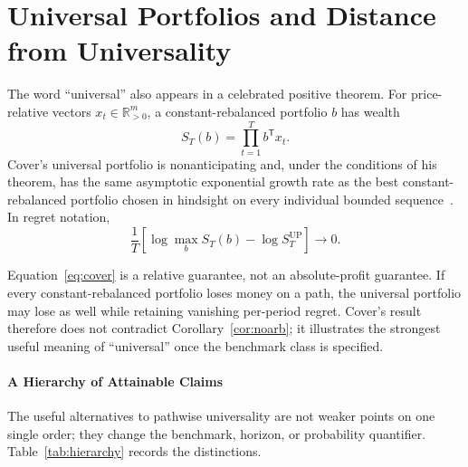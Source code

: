 \documentclass[aps,pra,reprint,superscriptaddress,amsmath,amssymb,floatfix]{revtex4-2}
\theoremstyle{plain}
\theoremstyle{definition}
\theoremstyle{remark}
\begin{document}
\section{Universal Portfolios and Distance from Universality}
\label{sec:cover}

The word ``universal'' also appears in a celebrated positive theorem.
For price-relative vectors \(x_t\in\mathbb{R}_{>0}^m\), a constant-rebalanced
portfolio \(b\) has wealth
\[
  S_T(b)=\prod_{t=1}^T b^\mathsf{T}x_t.
\]
Cover's universal portfolio is nonanticipating and, under the conditions of
his theorem, has the same asymptotic exponential growth rate as the best
constant-rebalanced portfolio chosen in hindsight on every individual bounded
sequence~\cite{Cover1991}. In regret notation,
\begin{equation}
  \frac1T\left[
  \log\max_{b}S_T(b)-\log S_T^{\mathrm{UP}}
  \right]\longrightarrow0.
  \label{eq:cover}
\end{equation}

Equation~\eqref{eq:cover} is a relative guarantee, not an absolute-profit
guarantee. If every constant-rebalanced portfolio loses money on a path, the
universal portfolio may lose as well while retaining vanishing per-period
regret. Cover's result therefore does not contradict
Corollary~\ref{cor:noarb}; it illustrates the strongest useful meaning of
``universal'' once the benchmark class is specified.

\paragraph{A Hierarchy of Attainable Claims}

The useful alternatives to pathwise universality are not weaker points on one
single order; they change the benchmark, horizon, or probability quantifier.
Table~\ref{tab:hierarchy} records the distinctions.
\end{document}
